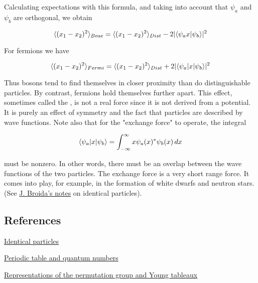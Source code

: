 Calculating expectations with this formula, and taking into account that $\psi_a$ and $\psi_b$ are orthogonal, we obtain

\begin{equation}
\langle (x_1 - x_2)^2 \rangle_{Bose} = \langle (x_1 - x_2)^2 \rangle_{Dist} - 2|\langle\psi_a x | \psi_b \rangle|^2
\end{equation}

For fermions we have

\begin{equation}
\langle (x_1 - x_2)^2 \rangle_{Fermi} = \langle (x_1 - x_2)^2 \rangle_{Dist} + 2|\langle\psi_a | x | \psi_b \rangle|^2
\end{equation}

Thus bosons tend to find themselves in closer proximity than do distinguishable particles.  By contrast, fermions hold themselves further apart.  This effect, sometimes called the   , is not a real force since it is not derived from a potential.  It is purely an effect of symmetry and the fact that particles are described by wave functions.  Note also that for the "exchange force" to operate, the integral

\begin{equation}
\langle\psi_a | x | \psi_b \rangle = \int^\infty_{-\infty} x\psi_a(x)^*\psi_b(x)\, dx
\end{equation}

must be nonzero.  In other words, there must be an overlap between the wave functions of the two particles.  The exchange force is a very short range force.  It comes into play, for example, in the formation of white dwarfs and neutron stars. (See \href{http://physics.ucsd.edu/students/courses/fall2009/physics130b/IdentParts.pdf}{J. Broida's notes} on identical particles).




\subsection{References}

\begin{thebibliography}

 \href{http://physics.ucsd.edu/students/courses/fall2009/physics130b/IdentParts.pdf}{Identical particles}

 \href{http://hyperphysics.phy-astr.gsu.edu/hbase/chemical/eleorb.html}{Periodic table and quantum numbers}

 \href{http://yufeizhao.com/papers/youngtab-hcmr.pdf}{Representations of the permutation group and Young tableaux}


\end{thebibliography}
